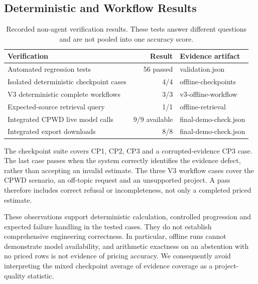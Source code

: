 \documentclass[11pt,a4paper]{article}
\begin{document}
\subsection{Deterministic and Workflow Results}
\begin{table}[H]\caption{Recorded non-agent verification results. These tests answer different questions and are not pooled into one accuracy score.}\small
\begin{tabularx}{\linewidth}{Xrl}\toprule
Verification & Result & Evidence artifact \\\midrule
Automated regression tests & 56 passed & validation.json \\
Isolated deterministic checkpoint cases & 4/4 & offline-checkpoints \\
V3 deterministic complete workflows & 3/3 & v3-offline-workflow \\
Expected-source retrieval query & 1/1 & offline-retrieval \\
Integrated CPWD live model calls & 9/9 available & final-demo-check.json \\
Integrated export downloads & 8/8 & final-demo-check.json \\\bottomrule
\end{tabularx}\end{table}
The checkpoint suite covers CP1, CP2, CP3 and a corrupted-evidence CP3 case. The last case passes when the system correctly identifies the evidence defect, rather than accepting an invalid estimate. The three V3 workflow cases cover the CPWD scenario, an off-topic request and an unsupported project. A pass therefore includes correct refusal or incompleteness, not only a completed priced estimate.

These observations support deterministic calculation, controlled progression and expected failure handling in the tested cases. They do not establish comprehensive engineering correctness. In particular, offline runs cannot demonstrate model availability, and arithmetic exactness on an abstention with no priced rows is not evidence of pricing accuracy. We consequently avoid interpreting the mixed checkpoint average of evidence coverage as a project-quality statistic.
\end{document}
